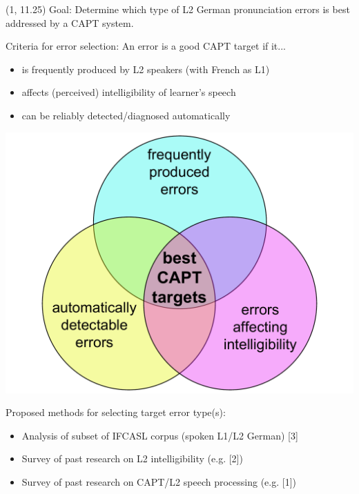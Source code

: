 \documentclass[a0,portrait]{a0poster}
\newcommand{\headingcolor}{\color{BannerSixColor}}
\def\Highlight#1{{\sffamily \headingcolor #1}}
\let\Textsize\Large
\begin{document}
 \begin{textblock}{7}(1, 11.25)
\Textsize
\Highlight{Goal:} Determine which type of L2 German pronunciation errors 
is best addressed by a CAPT system.

\Highlight{Criteria for error selection:} An error is a good CAPT target if it...
\begin{itemize}
\item{is frequently produced by L2 speakers (with French as L1)}
\item{affects (perceived) intelligibility of learner's speech}
\item{can be reliably detected/diagnosed automatically}
\end{itemize}

\begin{center}
\includegraphics{../../../img/error-venn.pdf}
\end{center}

\Highlight{Proposed methods for selecting target error type(s):}
\begin{itemize}
\item{Analysis of subset of IFCASL corpus (spoken L1/L2 German) [3]}
\item{Survey of past research on L2 intelligibility (e.g. [2])}
\item{Survey of past research on CAPT/L2 speech processing (e.g. [1])}
\end{itemize}


\end{textblock}
\end{document}
